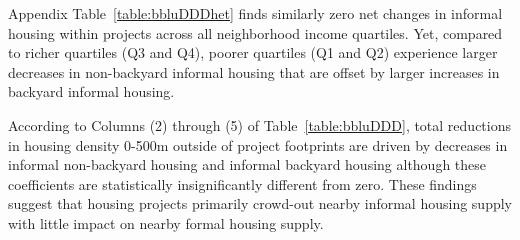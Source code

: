 \documentclass[12pt]{article}
\begin{document}
Appendix Table~\ref{table:bbluDDDhet} finds similarly zero net changes in informal housing within projects across all neighborhood income quartiles.  Yet, compared to richer quartiles (Q3 and Q4), poorer quartiles (Q1 and Q2) experience larger decreases in non-backyard informal housing that are offset by larger increases in backyard informal housing.

According to Columns (2) through (5) of Table~\ref{table:bbluDDD}, total reductions in housing density 0-500m outside of project footprints are driven by decreases in informal non-backyard housing and informal backyard housing although these coefficients are statistically insignificantly different from zero.  These findings suggest that housing projects primarily crowd-out nearby informal housing supply with little impact on nearby formal housing supply.



\end{document}
